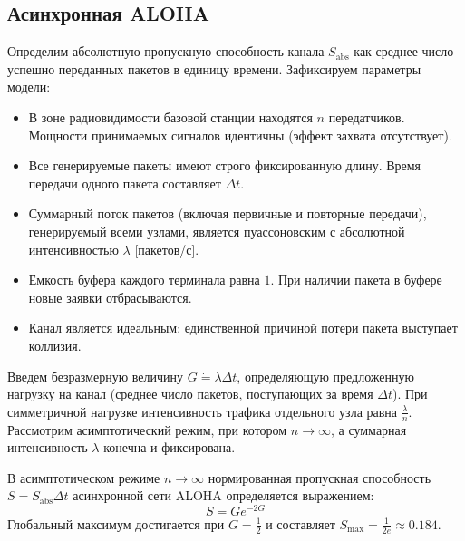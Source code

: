 \subsection{Асинхронная ALOHA}

Определим абсолютную пропускную способность канала $S_{\text{abs}}$ как среднее число успешно переданных пакетов в единицу времени. Зафиксируем параметры модели:

\begin{itemize}
    \item В зоне радиовидимости базовой станции находятся $n$ передатчиков. Мощности принимаемых сигналов идентичны (эффект захвата отсутствует).
    \item Все генерируемые пакеты имеют строго фиксированную длину. Время передачи одного пакета составляет $\Delta t$.
    \item Суммарный поток пакетов (включая первичные и повторные передачи), генерируемый всеми узлами, является пуассоновским с абсолютной интенсивностью $\lambda$ [пакетов/с].
    \item Емкость буфера каждого терминала равна $1$. При наличии пакета в буфере новые заявки отбрасываются.
    \item Канал является идеальным: единственной причиной потери пакета выступает коллизия.
\end{itemize}

Введем безразмерную величину $G \dot= \lambda \Delta t$, определяющую предложенную нагрузку на канал (среднее число пакетов, поступающих за время $\Delta t$). При симметричной нагрузке интенсивность трафика отдельного узла равна $\frac{\lambda}{n}$. Рассмотрим асимптотический режим, при котором $n \to \infty$, а суммарная интенсивность $\lambda$ конечна и фиксирована.

\begin{statement}
В асимптотическом режиме $n \to \infty$ нормированная пропускная способность $S = S_{\text{abs}} \Delta t$ асинхронной сети ALOHA определяется выражением:
$$S = G e^{-2G}$$
Глобальный максимум достигается при $G = \frac{1}{2}$ и составляет $S_{\max} = \frac{1}{2e} \approx 0.184$.
\end{statement}


